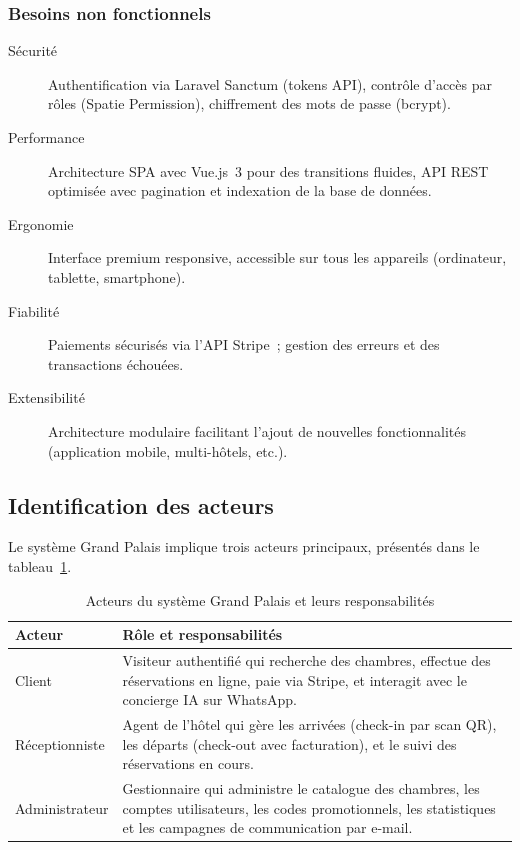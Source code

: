 \documentclass[12pt, a4paper]{report}
\begin{document}
\subsubsection{Besoins non fonctionnels}

\begin{description}
  \item[Sécurité] Authentification via Laravel Sanctum (tokens API), contrôle d'accès
    par rôles (Spatie Permission), chiffrement des mots de passe (bcrypt).
  \item[Performance] Architecture SPA avec Vue.js~3 pour des transitions fluides,
    API REST optimisée avec pagination et indexation de la base de données.
  \item[Ergonomie] Interface premium responsive, accessible sur tous les appareils
    (ordinateur, tablette, smartphone).
  \item[Fiabilité] Paiements sécurisés via l'API Stripe~; gestion des erreurs et
    des transactions échouées.
  \item[Extensibilité] Architecture modulaire facilitant l'ajout de nouvelles
    fonctionnalités (application mobile, multi-hôtels, etc.).
\end{description}

\subsection{Identification des acteurs}

Le système Grand Palais implique trois acteurs principaux, présentés dans le
tableau~\ref{tab:acteurs}.

\begin{table}[H]
  \centering
  \caption{Acteurs du système Grand Palais et leurs responsabilités}
  \label{tab:acteurs}
  \begin{tabularx}{\textwidth}{lX}
    \toprule
    \textbf{Acteur} & \textbf{Rôle et responsabilités} \\
    \midrule
    Client          & Visiteur authentifié qui recherche des chambres, effectue des
                      réservations en ligne, paie via Stripe, et interagit avec le
                      concierge IA sur WhatsApp. \\
    Réceptionniste  & Agent de l'hôtel qui gère les arrivées (check-in par scan QR),
                      les départs (check-out avec facturation), et le suivi des
                      réservations en cours. \\
    Administrateur  & Gestionnaire qui administre le catalogue des chambres, les
                      comptes utilisateurs, les codes promotionnels, les statistiques
                      et les campagnes de communication par e-mail. \\
    \bottomrule
  \end{tabularx}
\end{table}
\end{document}

